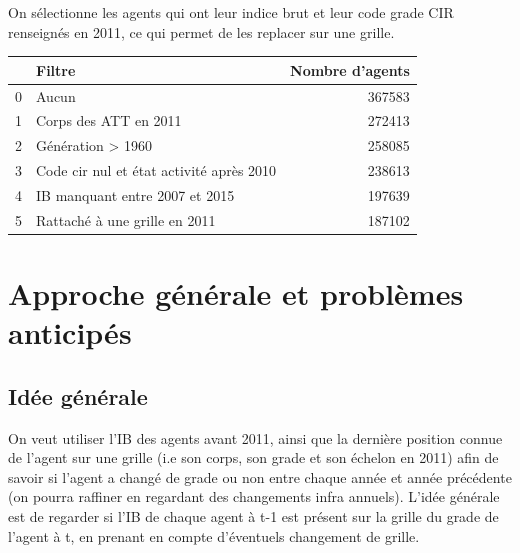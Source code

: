 \documentclass[11pt,a4paper]{article}
\begin{document}
On sélectionne les agents qui ont leur indice brut et leur code grade CIR renseignés en 2011, ce qui permet de les replacer sur une grille.
\begin{center}
\begin{tabular}{llr}
	\toprule
	{} &                                         Filtre &       Nombre d'agents \\
	\midrule
	0 &                                     Aucun &  367583 \\
	1 &                     Corps des ATT en 2011 &  272413 \\
	2 &                         Génération > 1960 &  258085 \\
	3 &  Code cir nul et état activité après 2010 &  238613 \\
	4 &            IB manquant entre 2007 et 2015 &  197639 \\
	5 &             Rattaché à une grille en 2011 &  187102 \\
	\bottomrule
\end{tabular}
\end{center}
 \bigskip

\section{Approche générale et problèmes anticipés}

\subsection{Idée générale}
On veut utiliser l'IB des agents avant 2011, ainsi que la dernière position connue de l'agent sur une grille (i.e son corps, son grade et son échelon en 2011) afin de savoir si l'agent a changé de grade ou non entre chaque année et année précédente (on pourra raffiner en regardant des changements infra annuels).
L'idée générale est de regarder si l'IB de chaque agent à t-1 est présent sur la grille du grade de l'agent à t, en prenant en compte d'éventuels changement de grille.
\end{document}
